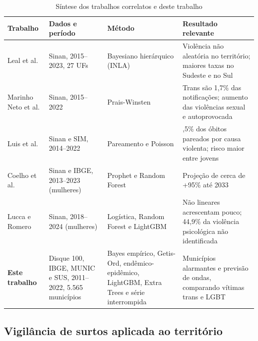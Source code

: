 \documentclass[12pt]{article}
\begin{document}
\begin{table}[!htb]
\centering
\caption{Síntese dos trabalhos correlatos e deste trabalho}
\label{tab:referencia}
{\renewcommand{\arraystretch}{1.15}\footnotesize
\begin{tabular}{>{\raggedright\arraybackslash}p{2.5cm} >{\raggedright\arraybackslash}p{3.1cm} >{\raggedright\arraybackslash}p{3.2cm} >{\raggedright\arraybackslash}p{4.4cm}}
\toprule
\textbf{Trabalho} & \textbf{Dados e período} & \textbf{Método} & \textbf{Resultado relevante} \\
\midrule
Leal et al. \cite{leal_silva_lizzi:2026} & Sinan, 2015--2023, 27 UFs & Bayesiano hierárquico (INLA) & Violência não aleatória no território; maiores taxas no Sudeste e no Sul \\
\addlinespace
Marinho Neto et al. \cite{marinho_tomazelli_firianelli:2024} & Sinan, 2015--2022 & Prais-Winsten & Trans são 1,7\% das notificações; aumento das violências sexual e autoprovocada \\
\addlinespace
Luis et al. \cite{luis:2025} & Sinan e SIM, 2014--2022 & Pareamento e Poisson & 42,5\% dos óbitos pareados por causa violenta; risco maior entre jovens \\
\addlinespace
Coelho et al. \cite{coelho_jiv:2025} & Sinan e IBGE, 2013--2023 (mulheres) & Prophet e Random Forest & Projeção de cerca de +95\% até 2033 \\
\addlinespace
Lucca e Romero \cite{lucca_romero_sbbd:2026} & Sinan, 2018--2024 (mulheres) & Logística, Random Forest e LightGBM & Não lineares acrescentam pouco; 44,9\% da violência psicológica não identificada \\
\midrule
\textbf{Este trabalho} & Disque 100, IBGE, MUNIC e SUS, 2011--2022, 5.565 municípios & Bayes empírico, Getis-Ord, endêmico-epidêmico, LightGBM, Extra Trees e série interrompida & Municípios alarmantes e previsão de ondas, comparando vítimas trans e LGBT \\
\bottomrule
\end{tabular}}
\end{table}

\subsection{Vigilância de surtos aplicada ao território}
\end{document}
